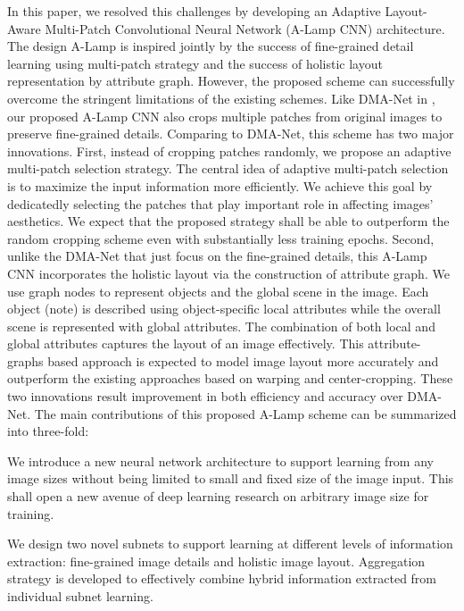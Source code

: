 \documentclass[10pt,twocolumn,letterpaper]{article}
\begin{document}
	In this paper, we resolved this challenges by developing an Adaptive Layout-Aware Multi-Patch Convolutional Neural Network (A-Lamp CNN) architecture. The design A-Lamp is inspired jointly by the success of fine-grained detail learning using multi-patch strategy \cite{Lu:2015:ICCV,Liu:2016:CVPR:multi_patch} and the success of holistic layout representation by attribute graph. However, the proposed scheme can successfully overcome the stringent limitations of the existing schemes.
	Like DMA-Net in \cite{Lu:2015:ICCV}, our proposed A-Lamp CNN also crops multiple patches from original images to preserve fine-grained details. Comparing to DMA-Net, this scheme has two major innovations. First, instead of cropping patches randomly, we propose an adaptive multi-patch selection strategy. The central idea of adaptive multi-patch selection is to maximize the input information more efficiently. We achieve this goal by dedicatedly selecting the patches that play important role in affecting images' aesthetics. We expect that the proposed strategy shall be able to outperform the random cropping scheme even with substantially less training epochs. Second, unlike the DMA-Net that just focus on the fine-grained details, this A-Lamp CNN incorporates the holistic layout via the construction of attribute graph. We use graph nodes to represent objects and the global scene in the image. Each object (note) is described using object-specific local attributes while the overall scene is represented with global attributes. The combination of both local and global attributes captures the layout of an image effectively. This attribute-graphs based approach is expected to model image layout more accurately and outperform the existing approaches based on warping and center-cropping. These two innovations result improvement in both efficiency and accuracy over DMA-Net. The main contributions of this proposed A-Lamp scheme can be summarized into three-fold:
	


	 We introduce a new neural network architecture to support learning from any image sizes without being limited to small and fixed size of the image input. This shall open a new avenue of deep learning research on arbitrary image size for training.
	
	 We design two novel subnets to support learning at different levels of information extraction: fine-grained image details and holistic image layout. Aggregation strategy is developed to effectively combine hybrid information extracted from individual subnet learning.
	
\end{document}
